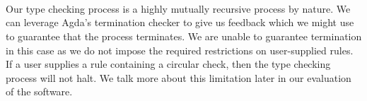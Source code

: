 \begin{code}
%
\>[6]\AgdaSpace{}%
\AgdaSpace{}%
\AgdaSpace{}%
\AgdaSpace{}%
\AgdaSpace{}%
\AgdaSpace{}%
\AgdaSpace{}%
\<%
\\
%
\>[6]\AgdaSpace{}%
\AgdaSpace{}%
\AgdaSpace{}%
\AgdaSymbol{(}\AgdaSpace{}%
\AgdaSpace{}%
\AgdaSymbol{(}\AgdaSpace{}%
\AgdaSymbol{))}\<%
\\
%
\>[6]\AgdaSymbol{\AgdaUnderscore{}}\AgdaSpace{}%
\AgdaSpace{}%
\AgdaSpace{}%
\AgdaSpace{}%
\AgdaSpace{}%
\<%
\\
%
\>[6]\AgdaSpace{}%
\<%
\end{code}
Our type checking process is a highly mutually recursive process by nature. We can
leverage Agda's termination checker to give us feedback which we might use to
guarantee that the process terminates. We are unable to guarantee termination
in this case as we do not impose the required restrictions on user-supplied rules. If
a user supplies a rule containing a circular check, then the type checking
process will not halt. We talk more about this limitation later in our evaluation
of the software.
